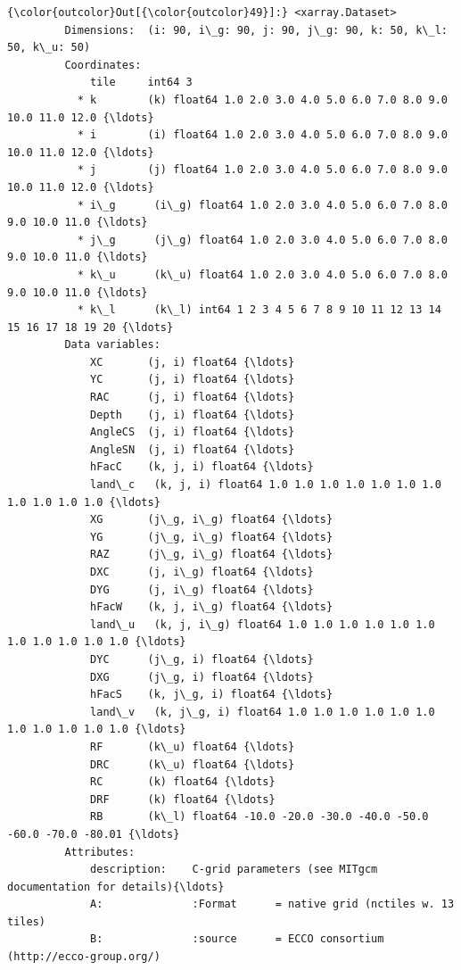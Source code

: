 \documentclass[11pt]{article}
\begin{document}
\begin{Verbatim}[commandchars=\\\{\}]
{\color{outcolor}Out[{\color{outcolor}49}]:} <xarray.Dataset>
         Dimensions:  (i: 90, i\_g: 90, j: 90, j\_g: 90, k: 50, k\_l: 50, k\_u: 50)
         Coordinates:
             tile     int64 3
           * k        (k) float64 1.0 2.0 3.0 4.0 5.0 6.0 7.0 8.0 9.0 10.0 11.0 12.0 {\ldots}
           * i        (i) float64 1.0 2.0 3.0 4.0 5.0 6.0 7.0 8.0 9.0 10.0 11.0 12.0 {\ldots}
           * j        (j) float64 1.0 2.0 3.0 4.0 5.0 6.0 7.0 8.0 9.0 10.0 11.0 12.0 {\ldots}
           * i\_g      (i\_g) float64 1.0 2.0 3.0 4.0 5.0 6.0 7.0 8.0 9.0 10.0 11.0 {\ldots}
           * j\_g      (j\_g) float64 1.0 2.0 3.0 4.0 5.0 6.0 7.0 8.0 9.0 10.0 11.0 {\ldots}
           * k\_u      (k\_u) float64 1.0 2.0 3.0 4.0 5.0 6.0 7.0 8.0 9.0 10.0 11.0 {\ldots}
           * k\_l      (k\_l) int64 1 2 3 4 5 6 7 8 9 10 11 12 13 14 15 16 17 18 19 20 {\ldots}
         Data variables:
             XC       (j, i) float64 {\ldots}
             YC       (j, i) float64 {\ldots}
             RAC      (j, i) float64 {\ldots}
             Depth    (j, i) float64 {\ldots}
             AngleCS  (j, i) float64 {\ldots}
             AngleSN  (j, i) float64 {\ldots}
             hFacC    (k, j, i) float64 {\ldots}
             land\_c   (k, j, i) float64 1.0 1.0 1.0 1.0 1.0 1.0 1.0 1.0 1.0 1.0 1.0 {\ldots}
             XG       (j\_g, i\_g) float64 {\ldots}
             YG       (j\_g, i\_g) float64 {\ldots}
             RAZ      (j\_g, i\_g) float64 {\ldots}
             DXC      (j, i\_g) float64 {\ldots}
             DYG      (j, i\_g) float64 {\ldots}
             hFacW    (k, j, i\_g) float64 {\ldots}
             land\_u   (k, j, i\_g) float64 1.0 1.0 1.0 1.0 1.0 1.0 1.0 1.0 1.0 1.0 1.0 {\ldots}
             DYC      (j\_g, i) float64 {\ldots}
             DXG      (j\_g, i) float64 {\ldots}
             hFacS    (k, j\_g, i) float64 {\ldots}
             land\_v   (k, j\_g, i) float64 1.0 1.0 1.0 1.0 1.0 1.0 1.0 1.0 1.0 1.0 1.0 {\ldots}
             RF       (k\_u) float64 {\ldots}
             DRC      (k\_u) float64 {\ldots}
             RC       (k) float64 {\ldots}
             DRF      (k) float64 {\ldots}
             RB       (k\_l) float64 -10.0 -20.0 -30.0 -40.0 -50.0 -60.0 -70.0 -80.01 {\ldots}
         Attributes:
             description:    C-grid parameters (see MITgcm documentation for details){\ldots}
             A:              :Format      = native grid (nctiles w. 13 tiles)
             B:              :source      = ECCO consortium (http://ecco-group.org/)

\end{Verbatim}
\end{document}
